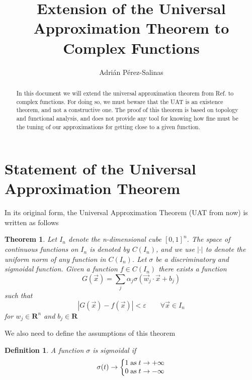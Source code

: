 \documentclass[aps,amssymb,amsmath,amsfonts,pra,superscriptaddress,twocolumn]{revtex4}
\newtheorem{theorem}{Theorem}
\newtheorem{definition}{Definition}
\begin{document}
\title{Extension of the Universal Approximation Theorem to Complex Functions}
\author{Adrián Pérez-Salinas}
\begin{abstract}
    In this document we will extend the universal approximation theorem from Ref. \cite{uat-cybenko1989} to complex functions. For doing so, we must beware that the UAT is an existence theorem, and not a constructive one. The proof of this theorem is based on topology and functional analysis, and does not provide any tool for knowing how fine must be the tuning of our approximations for getting close to a given function.
\end{abstract}
\maketitle

\section{Statement of the Universal Approximation Theorem}
In its original form, the Universal Approximation Theorem (UAT from now) is written as follows
\begin{theorem}
Let $I_n$ denote the n-dimensional cube $[0, 1]^n$. The space of continuous functions on $I_n$ is denoted by $C(I_n)$, and we use $|\cdot|$ to denote the uniform norm of any function in $C(I_n)$. 
Let $\sigma$ be a discriminatory and sigmoidal function. 
Given a function $f \in C(I_n)$ there exists a function 
\begin{equation}\label{eq:UAT}
    G(\vec x) = \sum_j \alpha_j \sigma(\vec w_j \cdot \vec x + b_j)
\end{equation}
such that 
\begin{equation}
    |G(\vec x) - f(\vec x)| < \varepsilon \qquad \forall \vec x \in I_n
\end{equation}
for $w_j\in \mathbf{R}^n$ and $b_j \in \mathbf{R}$
\end{theorem}

We also need to define the assumptions of this theorem

\begin{definition}
A function $\sigma$ is sigmoidal if
\begin{equation}
    \sigma(t) \rightarrow \left\lbrace \begin{matrix}
    1 \;{\rm as}\; t\rightarrow +\infty \\
    0 \;{\rm as}\; t\rightarrow -\infty 
    \end{matrix} \right.
\end{equation}
\end{definition}{}
\end{document}
